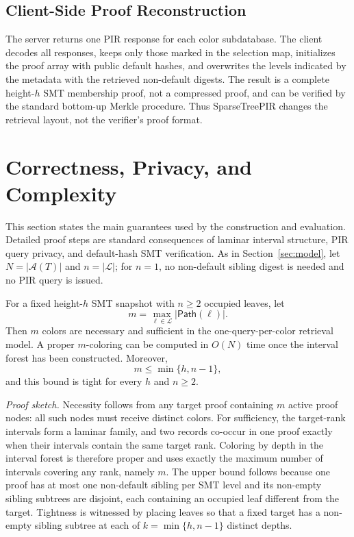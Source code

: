 \subsection{Client-Side Proof Reconstruction}

The server returns one PIR response for each color subdatabase. The client decodes all responses, keeps only those marked in the selection map, initializes the proof array with public default hashes, and overwrites the levels indicated by the metadata with the retrieved non-default digests. The result is a complete height-$h$ SMT membership proof, not a compressed proof, and can be verified by the standard bottom-up Merkle procedure. Thus SparseTreePIR changes the retrieval layout, not the verifier's proof format.

\section{Correctness, Privacy, and Complexity}
\label{sec:correctness}

This section states the main guarantees used by the construction and evaluation. Detailed proof steps are standard consequences of laminar interval structure, PIR query privacy, and default-hash SMT verification. As in Section~\ref{sec:model}, let $N=|\mathcal{A}(T)|$ and $n=|\mathcal{L}|$; for $n=1$, no non-default sibling digest is needed and no PIR query is issued.

\begin{theorem}
\label{thm:mincolor}
For a fixed height-$h$ SMT snapshot with $n\ge2$ occupied leaves, let
\[
    m=\max_{\ell\in\mathcal{L}}|\mathsf{Path}(\ell)|.
\]
Then $m$ colors are necessary and sufficient in the one-query-per-color retrieval model. A proper $m$-coloring can be computed in $O(N)$ time once the interval forest has been constructed. Moreover,
\[
m\le \min\{h,n-1\},
\]
and this bound is tight for every $h$ and $n\ge 2$.
\end{theorem}

\noindent\emph{Proof sketch.}
Necessity follows from any target proof containing $m$ active proof nodes: all such nodes must receive distinct colors. For sufficiency, the target-rank intervals form a laminar family, and two records co-occur in one proof exactly when their intervals contain the same target rank. Coloring by depth in the interval forest is therefore proper and uses exactly the maximum number of intervals covering any rank, namely $m$. The upper bound follows because one proof has at most one non-default sibling per SMT level and its non-empty sibling subtrees are disjoint, each containing an occupied leaf different from the target. Tightness is witnessed by placing leaves so that a fixed target has a non-empty sibling subtree at each of $k=\min\{h,n-1\}$ distinct depths.

